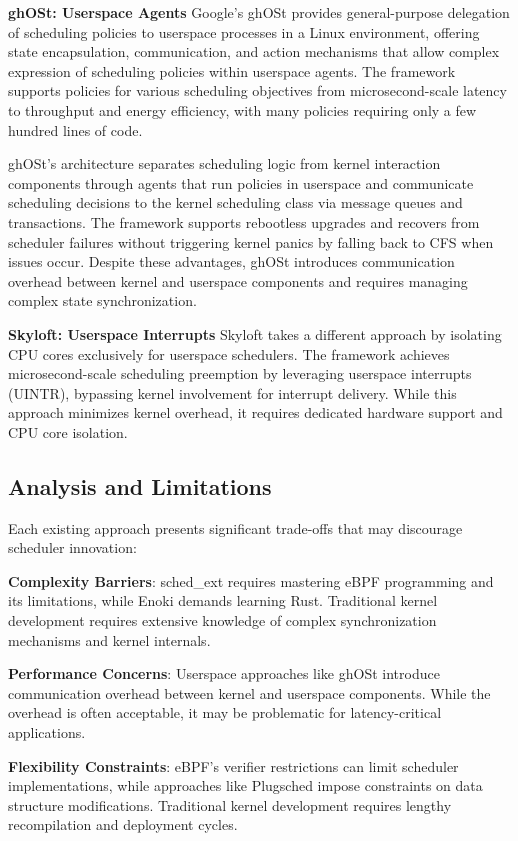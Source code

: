 \parspace
\textbf{ghOSt: Userspace Agents} Google's ghOSt provides general-purpose delegation of scheduling policies to userspace processes in a Linux environment, offering state encapsulation, communication, and action mechanisms that allow complex expression of scheduling policies within userspace agents. The framework supports policies for various scheduling objectives from microsecond-scale latency to throughput and energy efficiency, with many policies requiring only a few hundred lines of code.

\parspace
ghOSt's architecture separates scheduling logic from kernel interaction components through agents that run policies in userspace and communicate scheduling decisions to the kernel scheduling class via message queues and transactions. The framework supports rebootless upgrades and recovers from scheduler failures without triggering kernel panics by falling back to CFS when issues occur. Despite these advantages, ghOSt introduces communication overhead between kernel and userspace components and requires managing complex state synchronization.

\parspace
\textbf{Skyloft: Userspace Interrupts} Skyloft\cite{skyloft} takes a different approach by isolating CPU cores exclusively for userspace schedulers. The framework achieves microsecond-scale scheduling preemption by leveraging userspace interrupts (UINTR), bypassing kernel involvement for interrupt delivery. While this approach minimizes kernel overhead, it requires dedicated hardware support and CPU core isolation.

\subsection{Analysis and Limitations}

Each existing approach presents significant trade-offs that may discourage scheduler innovation:

\parspace
\textbf{Complexity Barriers}: sched\_ext requires mastering eBPF programming and its limitations, while Enoki demands learning Rust. Traditional kernel development requires extensive knowledge of complex synchronization mechanisms and kernel internals.

\parspace
\textbf{Performance Concerns}: Userspace approaches like ghOSt introduce communication overhead between kernel and userspace components. While the overhead is often acceptable, it may be problematic for latency-critical applications.

\parspace
\textbf{Flexibility Constraints}: eBPF's verifier restrictions can limit scheduler implementations, while approaches like Plugsched impose constraints on data structure modifications. Traditional kernel development requires lengthy recompilation and deployment cycles.

